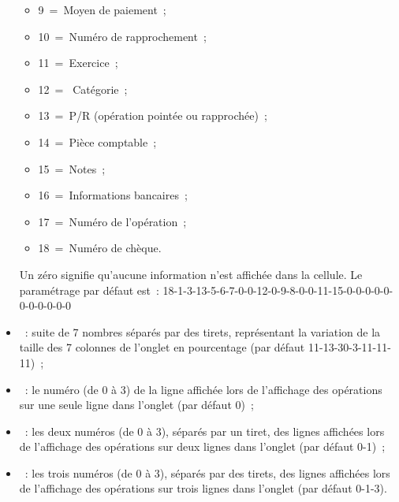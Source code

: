 \begin{itemize}
\begin{itemize}
	\item 9~=~Moyen de paiement~;

	\item 10~=~Numéro de rapprochement~;

	\item 11~=~Exercice~;

	\item 12~=~ Catégorie~;

	\item 13~=~P/R (opération pointée ou rapprochée)~;

	\item 14~=~Pièce comptable~;

	\item 15~=~Notes~;

	\item 16~=~Informations bancaires~;

	\item 17~=~Numéro de l'opération~;

	\item 18~=~Numéro de chèque.

	\end{itemize} 

Un zéro signifie qu'aucune information n'est affichée dans la cellule. Le paramétrage par défaut est~:
18-1-3-13-5-6-7-0-0-12-0-9-8-0-0-11-15-0-0-0-0-0-0-0-0-0-0-0

\item {}~: suite de 7 nombres séparés par des tirets, représentant la variation de la taille des 7 colonnes de l'onglet  en pourcentage (par défaut 11-13-30-3-11-11-11)~;

\item {}~: le numéro (de 0 à 3) de la ligne affichée lors de l'affichage des opérations sur une seule ligne dans l'onglet  (par défaut 0)~;

\item {}~: les deux numéros (de 0 à 3), séparés par un tiret, des lignes affichées lors de l'affichage des opérations sur deux lignes dans l'onglet  (par défaut 0-1)~;

\item {}~: les trois numéros (de 0 à 3), séparés par des tirets, des lignes affichées lors de l'affichage des opérations sur trois lignes dans l'onglet  (par défaut 0-1-3).

\end{itemize}

